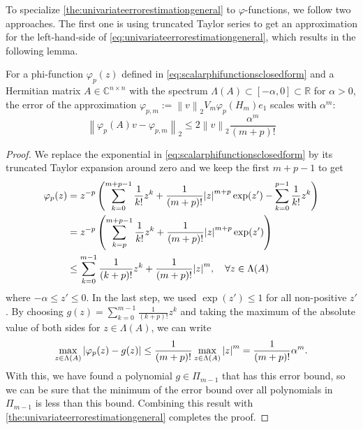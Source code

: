 To specialize \autoref{the:univariateerrorestimationgeneral} to $\varphi$-functions, we follow two approaches. The
first one is using truncated Taylor series to get an approximation for the left-hand-side of
\eqref{eq:univariateerrorestimationgeneral}, which results in the following lemma.

\begin{lemma}
    \label{lem:univariateerrorestimationphitaylor}
    For a phi-function $\varphi_p(z)$ defined in \eqref{eq:scalarphifunctionsclosedform} and a Hermitian matrix
    $A \in \mathbb{C}^{n \times n}$ with the spectrum $\Lambda(A) \subset [-\alpha, 0] \subset \mathbb{R}$ for $\alpha > 0$,
    the error of the approximation $\varphi_{p, m} := \left\| v \right\|_{2} V_m \varphi_p(H_m) e_1$ scales with
    $\alpha^m$:
    \begin{equation}
        \label{eq:univariateerrorestimationphitaylor}
        \left\| \varphi_p(A)v - \varphi_{p, m} \right\|_2 \le 2 \left\| v \right\|_2 \frac{\alpha^m}{(m+p)!}
    \end{equation}
\end{lemma}
\begin{proof}
    We replace the exponential in \eqref{eq:scalarphifunctionsclosedform} by its truncated Taylor expansion
    around zero and we keep the first $m+p-1$ to get
    \begin{equation*}
        \begin{aligned}
            \varphi_p(z) & = z^{-p} \left( \sum_{k=0}^{m+p-1}{\frac{1}{k!}z^k}
                + \frac{1}{(m+p)!} \abs{z}^{m+p} \exp(z') - \sum_{k=0}^{p-1}{\frac{1}{k!}z^{k}} \right)\\
            & = z^{-p} \left( \sum_{k=p}^{m+p-1}{\frac{1}{k!}z^k} + \frac{1}{(m+p)!} \abs{z}^{m+p} \exp(z') \right)\\
            & \le \sum_{k=0}^{m-1}{\frac{1}{(k+p)!}z^k} + \frac{1}{(m+p)!} \abs{z}^{m}, \quad \forall z \in \Lambda(A)
            \end{aligned}
    \end{equation*}
    where $-\alpha \le z' \le 0$. In the last step, we used $\exp(z') \le 1$ for all non-positive $z'$. By choosing $g(z) = \sum_{k=0}^{m-1}{\frac{1}{(k+p)!}z^k}$ and taking the maximum of the
    absolute value of both sides for $z \in \Lambda(A)$, we can write
    \begin{equation*}
        \max_{z \in \Lambda(A)}\left| \varphi_p(z) - g(z) \right|
        \le \frac{1}{(m+p)!} \max_{z \in \Lambda(A)}\abs{z}^{m}
        = \frac{1}{(m+p)!} \alpha^m.
    \end{equation*}
    With this, we have found a polynomial $g \in \Pi_{m-1}$ that has this error bound, so we can be sure that
    the minimum of the error bound over all polynomials in $\Pi_{m-1}$ is less than this bound. Combining this
    result with \autoref{the:univariateerrorestimationgeneral} completes the proof.
\end{proof}

